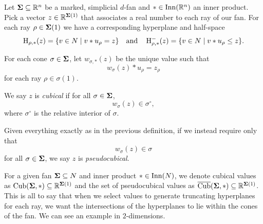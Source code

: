 \documentclass[12pt,oneside]{../../sfsuthesis}
\begin{document}
\begin{definition}\th\label{def:cubical}
    Let \( \bm{\Sigma} \subseteq \mathbb{R}^n \) be a marked, simplicial \( d \)-fan and \( \ast \in \operatorname{Inn}(\mathbb{R}^n) \) an inner product.
    Pick a vector \( z \in \mathbb{R}^{\bm{\Sigma}(1)} \) that associates a real number to each ray of our fan.
    For each ray \( \rho \in \bm{\Sigma}(1) \) we have a corresponding hyperplane and half-space
    \[
        \operatorname{H}_{\rho, \ast}(z) = \{ v \in N \; | \; v \ast u_\rho = z \}
        \quad \text{and} \quad
        \operatorname{H}^{-}_{\rho, \ast}(z) = \{ v \in N \; | \; v \ast u_\rho \leq z \}.
    \]

    For each cone \( \sigma \in \bm{\Sigma} \), let \( w_{\sigma,\ast}(z) \) be the unique value such that
    \[
        w_{\sigma}(z) \ast u_\rho = z_\rho
    \]
    for each ray \(\rho \in \sigma(1)\).

    We say \( z \) is \emph{cubical} if for all \( \sigma \in \bm{\Sigma} \),
    \[
        w_{\sigma}(z)  \in \sigma^\circ,
    \]
    where \( \sigma^\circ \) is the relative interior of \( \sigma \).
\end{definition}
\begin{definition}[Pseudocubical]\th\label{def:pseudocubical}
    Given everything exactly as in the previous definition, if we instead require only that
    \[
        w_{\sigma}(z) \in \sigma
    \]
    for all \( \sigma \in \bm{\Sigma} \), we say \( z \) is \emph{pseudocubical}.
\end{definition}
For a given fan \( \bm{\Sigma} \subseteq N \) and inner product \( \ast \in \operatorname{Inn}(N) \), we denote cubical values as \( \operatorname{Cub}(\bm{\Sigma}, \ast) \subseteq \mathbb{R}^{\bm{\Sigma}(1)} \) and the set of pseudocubical values as \( \operatorname{\overline{Cub}}(\bm{\Sigma}, \ast) \subseteq \mathbb{R}^{\bm{\Sigma}(1)} \).
This is all to say that when we select values to generate truncating hyperplanes for each ray, we want the intersections of the hyperplanes to lie within the cones of the fan.
We can see an example in \( 2 \)-dimensions.
\end{document}
